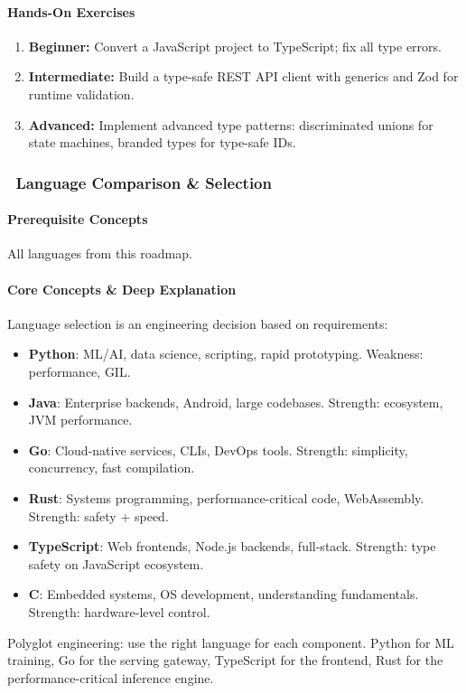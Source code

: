 \documentclass[11pt, a4paper, oneside]{report}
\newcommand{\mustmaster}[1]{\subsubsection{\texorpdfstring{\fcolorbox{blue!40!black}{blue!8}{\footnotesize\bfseries\color{blue!40!black} MUST MASTER}~#1}{#1}}}
\begin{document}
\paragraph{Hands-On Exercises}
\begin{enumerate}[leftmargin=*]
\item \textbf{Beginner:} Convert a JavaScript project to TypeScript; fix all type errors.
\item \textbf{Intermediate:} Build a type-safe REST API client with generics and Zod for runtime validation.
\item \textbf{Advanced:} Implement advanced type patterns: discriminated unions for state machines, branded types for type-safe IDs.
\end{enumerate}

\mustmaster{Language Comparison \& Selection}

\paragraph{Prerequisite Concepts} All languages from this roadmap.

\paragraph{Core Concepts \& Deep Explanation} Language selection is an engineering decision based on requirements:

\begin{itemize}[leftmargin=*]
\item \textbf{Python}: ML/AI, data science, scripting, rapid prototyping. Weakness: performance, GIL.
\item \textbf{Java}: Enterprise backends, Android, large codebases. Strength: ecosystem, JVM performance.
\item \textbf{Go}: Cloud-native services, CLIs, DevOps tools. Strength: simplicity, concurrency, fast compilation.
\item \textbf{Rust}: Systems programming, performance-critical code, WebAssembly. Strength: safety + speed.
\item \textbf{TypeScript}: Web frontends, Node.js backends, full-stack. Strength: type safety on JavaScript ecosystem.
\item \textbf{C}: Embedded systems, OS development, understanding fundamentals. Strength: hardware-level control.
\end{itemize}

Polyglot engineering: use the right language for each component. Python for ML training, Go for the serving gateway, TypeScript for the frontend, Rust for the performance-critical inference engine.
\end{document}
